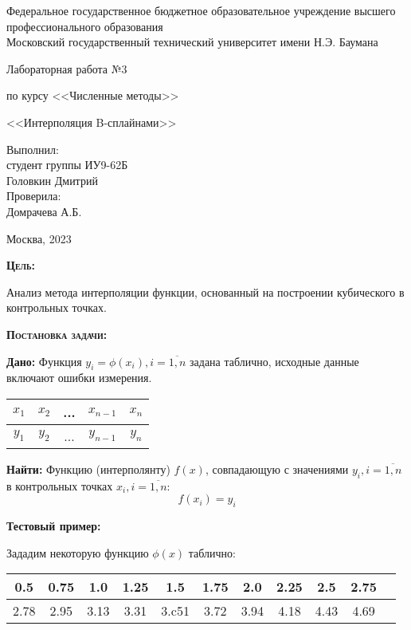 \documentclass [12pt]{article}
\title{}
\date{}
\author{}
\begin{document}
\begin{titlepage}
\thispagestyle{empty}
\begin{center}
Федеральное государственное бюджетное образовательное учреждение высшего профессионального образования \\Московский государственный технический университет имени Н.Э. Баумана

\end{center}
\vfill
\centerline{\large{Лабораторная работа №3}}
\centerline{\large{по курсу <<Численные методы>>}}
\centerline{\large{<<Интерполяция B-сплайнами>>}}
\vfill
\hfill\parbox{5cm} {
           Выполнил:\\
           студент группы ИУ9-62Б \hfill \\
           Головкин Дмитрий\hfill \medskip\\
           Проверила:\\
           Домрачева А.Б.\hfill
       }
\centerline{Москва, 2023}
\clearpage
\end{titlepage}

\textsc{\textbf{Цель:}} 

Анализ метода интерполяции функции, основанный на построении кубического в контрольных точках.

\textsc{\textbf{Постановка задачи:}} 

\textbf{Дано:}  Функция $y_i = \phi(x_i),  i = \overline{1,n}$ задана таблично, исходные данные включают ошибки измерения.

\begin{table}[h]
\begin{center}
\begin{tabular}{|c|c|c|c|c|}
\hline
$x_1$ & $x_2$ & ... & $x_{n-1}$ & $x_n$ \\
\hline
$y_1$ & $y_2$ & ... & $y_{n-1}$ & $y_n$ \\
\hline
\end{tabular}
\end{center}
\end{table}

\textbf{Найти:} Функцию (интерполянту) $f(x)$, совпадающую с значениями $y_i, i = \overline{1,n}$ в контрольных точках $x_i, i = \overline{1,n}$:
$$f(x_i)=y_i$$

\textbf{Тестовый пример:} 

Зададим некоторую функцию $\phi(x)$ таблично:

\begin{table}[h]
\begin{center}
\begin{tabular}{|c|c|c|c|c|c|c|c|c|c|c|}
\hline
0.5 & 0.75 & 1.0 & 1.25 & 1.5 & 1.75 & 2.0 & 2.25 & 2.5 & 2.75\\
\hline
2.78 & 2.95 & 3.13 & 3.31 & 3.c51 & 3.72 & 3.94 & 4.18 & 4.43 & 4.69\\
\hline
\end{tabular}
\end{center}
\end{table}
\end{document}
